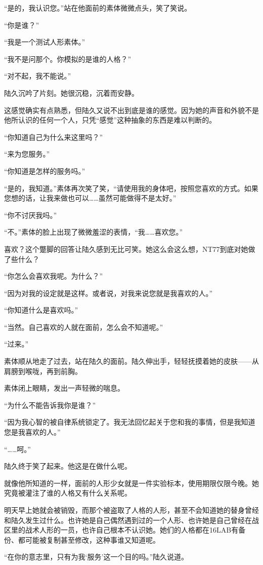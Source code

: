 “是的，我认识您。”站在他面前的素体微微点头，笑了笑说。

“你是谁？”

“我是一个测试人形素体。”

“我不是问那个。你模拟的是谁的人格？”

“对不起，我不能说。”

陆久沉吟了片刻。她很沉稳，沉着而安静。

这感觉确实有点熟悉，但陆久又说不出到底是谁的感觉。因为她的声音和外貌不是他所认识的任何一个人，只凭“感觉”这种抽象的东西是难以判断的。

“你知道自己为什么来这里吗？”

“来为您服务。”

“你知道是怎样的服务吗。”

“是的，我知道。”素体再次笑了笑，“请使用我的身体吧，按照您喜欢的方式。如果您想的话，让我来做也可以……虽然可能做得不是太好。”

“你不讨厌我吗。”

“不。”素体的脸上出现了微微羞涩的表情，“我……喜欢您。”

喜欢？这个蹩脚的回答让陆久感到无比可笑。她这么会这么想，NT77到底对她做了些什么？

“你怎么会喜欢我呢。为什么？”

“因为对我的设定就是这样。或者说，对我来说您就是我喜欢的人。”

“你知道什么是喜欢吗。”

“当然。自己喜欢的人就在面前，怎么会不知道呢。”

“过来。”

素体顺从地走了过去，站在陆久的面前。陆久伸出手，轻轻抚摸着她的皮肤——从肩膀到喉咙，再到前胸。

素体闭上眼睛，发出一声轻微的喘息。

“为什么不能告诉我你是谁？”

“因为我心智的被自律系统锁定了。我无法回忆起关于您和我的事情，但是我知道您是我喜欢的人。”

“……呵。”

陆久终于笑了起来。他这是在做什么呢。

就像他所知道的一样，面前的人形少女就是一件实验标本，使用期限仅限今晚。她究竟被灌注了谁的人格又有什么关系呢。

明天早上她就会被销毁，而那个被盗取了人格的人形，甚至不会知道她的替身曾经和陆久发生过什么。也许她是自己偶然遇到过的一个人形、也许她是自己曾经在战区里的战术人形的一员，也许自己根本不认识她。她们的人格都在16LAB有备份、都可能被复制甚至修改，这种事谁又知道呢。

“在你的意志里，只有为我‘服务’这一个目的吗。”陆久说道。

